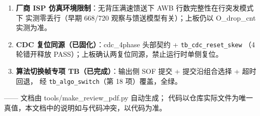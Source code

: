 \documentclass[10pt]{ctexart}
\newcommand{\code}[1]{\texttt{#1}}
\begin{document}
\begin{enumerate}
        寄存器序列（116 条）本身已由 ROM 逐条确认。
  \item \textbf{厂商 ISP 仿真环境限制}：无背压满速馈送下 AWB 行数完整性在行突发模式下
        实测零丢行（早期 668/720 观察与馈送模型有关）；上板仍以 O\_drop\_cnt 实测为准。
  \item \textbf{CDC 复位同源（已固化）}：cdc\_4phase 头部契约 + \code{tb\_cdc\_reset\_skew}
        （4 轮错开释放 PASS）；上板确认两复位同源，禁止运行时单侧复位。
  \item \textbf{算法切换帧专项 TB（已完成）}：输出侧 SOF 提交 + 提交沿组合选择 + 超时回退，
        经 \code{tb\_algo\_switch}（第 18 项）覆盖，全绿。
\end{enumerate}

\vspace{6pt}
{\small\color{black!60} —— 文档由 tools/make\_review\_pdf.py 自动生成；
代码以仓库实际文件为唯一真值，本文档中的说明如与代码冲突，以代码为准。}
\end{document}

